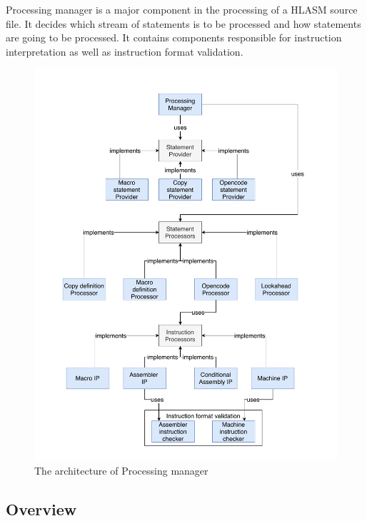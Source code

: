 \label{chap:process}
Processing manager is a major component in the processing of a HLASM source file. It decides which stream of statements is to be processed and how statements are going to be processed. It contains components responsible for instruction interpretation as well as instruction format validation. 

\begin{figure}
	\centering
	\includegraphics[width=\textwidth]{img/processing_manager_arch}
	\caption{The architecture of Processing manager}
	\label{fig06:proc_mngr}
\end{figure}

\subsection{Overview}

